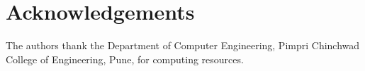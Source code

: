 \documentclass[11pt,a4paper]{article}
\DeclareRobustCommand*{\_}{\textunderscore\hskip0pt\relax}
\begin{document}
\section*{Acknowledgements}
The authors thank the Department of Computer Engineering, Pimpri Chinchwad College of Engineering, Pune, for computing resources.

{\small
}
\end{document}
